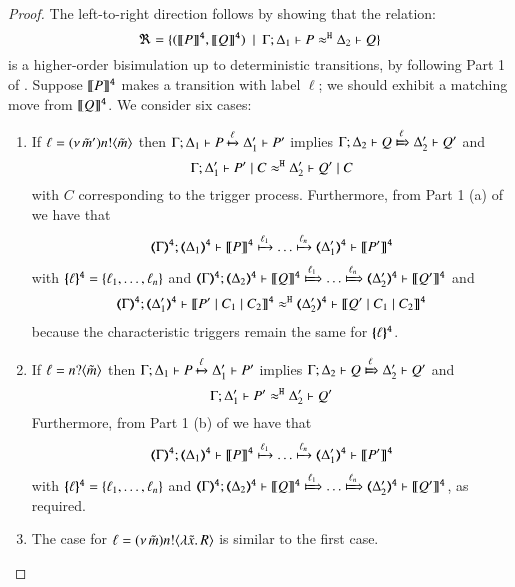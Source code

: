 \begin{proof}
			

\bigskip

\noi	The left-to-right direction follows by showing that the relation: %
%
	\[
		\Re = \{
		(\llbracket P\rrbracket^\mathtt{4}, \llbracket Q\rrbracket^\mathtt{4})
		\ \ |\ \  \Gamma; \Delta_1 \vdash P \approx^\mathtt{H} \Delta_2 \vdash Q\}
	\]
is a higher-order bisimulation up to deterministic transitions, by following Part 1 of .
	Suppose $\llbracket P\rrbracket^\mathtt{4}$ makes a transition with label $\ell$; we should exhibit a matching move from 
	$\llbracket Q\rrbracket^\mathtt{4}$. 
	We consider six cases:
	\begin{enumerate}
		\item
		If $\ell = (\nu\, \tilde{m}') n ! \langle \tilde{m} \rangle$ then
		$
		\Gamma; \Delta_1 \vdash P \xmapsto{\ell} \Delta_1' \vdash P'
		$
		implies
	$
		\horel{\Gamma}{\Delta_2}{Q}{\Hby{\ell}}{\Delta_2'}{Q'}
		$
		and
		\[
		\Gamma; \Delta_1' \vdash P' \;|\; C \approx^\mathtt{H} \Delta_2' \vdash Q' \;|\; C
		\]
		with $C$ corresponding to the trigger process.
		Furthermore, from Part 1 (a) of  we have that
		$$\horel{\tmap{\Gamma}{4}}{\tmap{\Delta_1}{4}}{\pmap{P}{4}}{\hby{\ell_1} \dots \hby{\ell_n}}{\tmap{\Delta_1'}{4}}{\pmap{P'}{4}}$$
		with $\{\!\!\{\ell\}\!\!\}^{\mathtt{4}} = \{\ell_1, \dots, \ell_n\}$
		and
		$\horel{\tmap{\Gamma}{4}}{\tmap{\Delta_2}{4}}{\pmap{Q}{4}}{\Hby{\ell_1} \dots \Hby{\ell_n}}{\tmap{\Delta_2'}{4}}{\pmap{Q'}{4}}$
		and
		\begin{eqnarray*}
			\horel{\tmap{\Gamma}{4}}{\tmap{\Delta_1'}{4}}{\pmap{P' \Par C_1 \Par C_2}{4}}{\hwb}{\tmap{\Delta_2'}{4}}{\pmap{Q' \Par C_1 \Par C_2}{4}}
		\end{eqnarray*}
		because the characteristic triggers remain the same for $\{\!\!\{\ell\}\!\!\}^{\mathtt{4}}$.
						
		\item	If $\ell = n ? \langle \tilde{m} \rangle$ then
				$
				\Gamma; \Delta_1 \vdash P \xmapsto{\ell} \Delta_1' \vdash P'
				$
				implies
				$
				\horel{\Gamma}{\Delta_2}{Q}{\Hby{\ell}}{\Delta_2'}{Q'}
				$
				and
				\[
				\Gamma; \Delta_1' \vdash P' \approx^\mathtt{H} \Delta_2' \vdash Q'
				\]
				Furthermore, from Part 1 (b) of  we have that
				$$\horel{\tmap{\Gamma}{4}}{\tmap{\Delta_1}{4}}{\pmap{P}{4}}{\hby{\ell_1} \dots \hby{\ell_n}}{\tmap{\Delta_1'}{4}}{\pmap{P'}{4}}$$
				with $\{\!\!\{\ell\}\!\!\}^{\mathtt{4}} = \{\ell_1, \dots, \ell_n\}$
				and
				$\horel{\tmap{\Gamma}{4}}{\tmap{\Delta_2}{4}}{\pmap{Q}{4}}{\Hby{\ell_1} \dots \Hby{\ell_n}}{\tmap{\Delta_2'}{4}}{\pmap{Q'}{4}}$,
				as required.
		\item	The case for $\ell = (\nu\, \tilde{m}) n ! \langle \lambda \tilde{x}.\,R \rangle$
		is similar to the first case.
		

\end{enumerate}
\end{proof}
